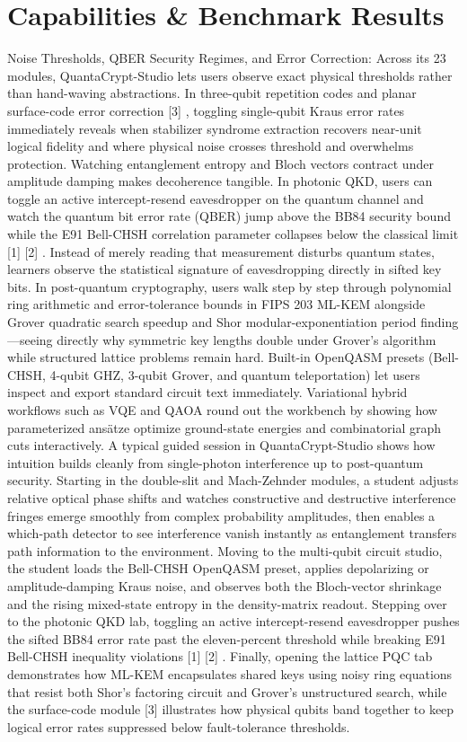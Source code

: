 \documentclass[10pt,letterpaper]{article}
\begin{document}
\section{Capabilities \& Benchmark Results}
Noise Thresholds, QBER Security Regimes, and Error Correction: Across its 23 modules, QuantaCrypt-Studio lets users observe exact physical thresholds rather than hand-waving abstractions. In three-qubit repetition codes and planar surface-code error correction [3] , toggling single-qubit Kraus error rates immediately reveals when stabilizer syndrome extraction recovers near-unit logical fidelity and where physical noise crosses threshold and overwhelms protection. Watching entanglement entropy and Bloch vectors contract under amplitude damping makes decoherence tangible. In photonic QKD, users can toggle an active intercept-resend eavesdropper on the quantum channel and watch the quantum bit error rate (QBER) jump above the BB84 security bound while the E91 Bell-CHSH correlation parameter collapses below the classical limit [1] [2] . Instead of merely reading that measurement disturbs quantum states, learners observe the statistical signature of eavesdropping directly in sifted key bits. In post-quantum cryptography, users walk step by step through polynomial ring arithmetic and error-tolerance bounds in FIPS 203 ML-KEM alongside Grover quadratic search speedup and Shor modular-exponentiation period finding---seeing directly why symmetric key lengths double under Grover's algorithm while structured lattice problems remain hard. Built-in OpenQASM presets (Bell-CHSH, 4-qubit GHZ, 3-qubit Grover, and quantum teleportation) let users inspect and export standard circuit text immediately. Variational hybrid workflows such as VQE and QAOA round out the workbench by showing how parameterized ansätze optimize ground-state energies and combinatorial graph cuts interactively. A typical guided session in QuantaCrypt-Studio shows how intuition builds cleanly from single-photon interference up to post-quantum security. Starting in the double-slit and Mach-Zehnder modules, a student adjusts relative optical phase shifts and watches constructive and destructive interference fringes emerge smoothly from complex probability amplitudes, then enables a which-path detector to see interference vanish instantly as entanglement transfers path information to the environment. Moving to the multi-qubit circuit studio, the student loads the Bell-CHSH OpenQASM preset, applies depolarizing or amplitude-damping Kraus noise, and observes both the Bloch-vector shrinkage and the rising mixed-state entropy in the density-matrix readout. Stepping over to the photonic QKD lab, toggling an active intercept-resend eavesdropper pushes the sifted BB84 error rate past the eleven-percent threshold while breaking E91 Bell-CHSH inequality violations [1] [2] . Finally, opening the lattice PQC tab demonstrates how ML-KEM encapsulates shared keys using noisy ring equations that resist both Shor's factoring circuit and Grover's unstructured search, while the surface-code module [3] illustrates how physical qubits band together to keep logical error rates suppressed below fault-tolerance thresholds.
\end{document}

